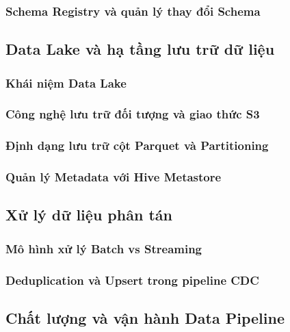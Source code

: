 \subsubsection{Schema Registry và quản lý thay đổi Schema}

\subsection{Data Lake và hạ tầng lưu trữ dữ liệu}
\subsubsection{Khái niệm Data Lake}
\subsubsection{Công nghệ lưu trữ đối tượng và giao thức S3}
\subsubsection{Định dạng lưu trữ cột Parquet và Partitioning}
\subsubsection{Quản lý Metadata với Hive Metastore}

\subsection{Xử lý dữ liệu phân tán}
\subsubsection{Mô hình xử lý Batch vs Streaming}
\subsubsection{Deduplication và Upsert trong pipeline CDC}

\subsection{Chất lượng và vận hành Data Pipeline}

